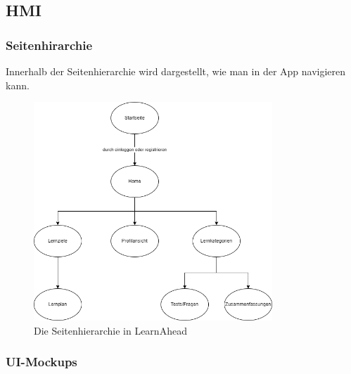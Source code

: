     \subsection{HMI}
    
    \subsubsection{Seitenhirarchie}
    Innerhalb der Seitenhierarchie wird dargestellt, wie man in der App navigieren kann.
    \begin{figure}[H]
        \centering
        \includegraphics[width=0.8\textwidth]{images/diagramme/Seitenhierarchie.png}
        \caption{Die Seitenhierarchie in LearnAhead}
        \label{fig:UseCaseDiagramm}
    \end{figure}
    
    \newpage
    \subsubsection{UI-Mockups}
    
